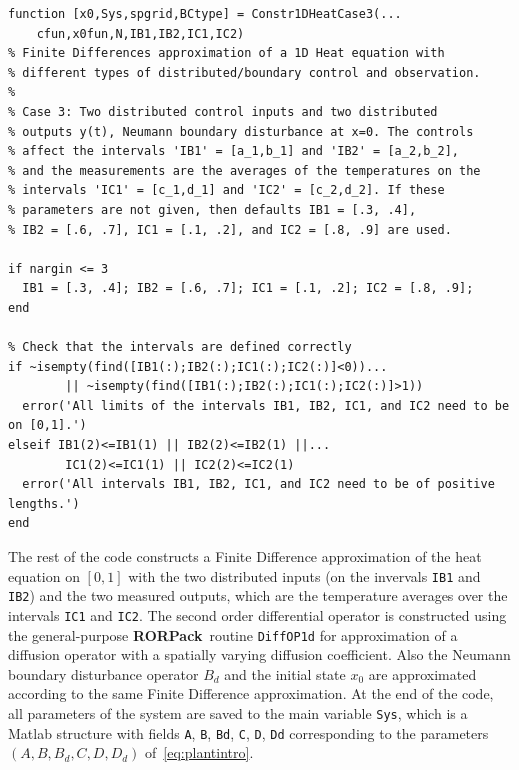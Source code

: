 \documentclass[11pt, a4paper]{amsart}
\theoremstyle{definition}
\numberwithin{equation}{section}
\newcommand{\RORname}{\textbf{RORPack}}
\begin{document}
\begin{lstlisting}
function [x0,Sys,spgrid,BCtype] = Constr1DHeatCase3(...
    cfun,x0fun,N,IB1,IB2,IC1,IC2)
% Finite Differences approximation of a 1D Heat equation with
% different types of distributed/boundary control and observation.
%
% Case 3: Two distributed control inputs and two distributed 
% outputs y(t), Neumann boundary disturbance at x=0. The controls 
% affect the intervals 'IB1' = [a_1,b_1] and 'IB2' = [a_2,b_2],
% and the measurements are the averages of the temperatures on the
% intervals 'IC1' = [c_1,d_1] and 'IC2' = [c_2,d_2]. If these
% parameters are not given, then defaults IB1 = [.3, .4],
% IB2 = [.6, .7], IC1 = [.1, .2], and IC2 = [.8, .9] are used.

if nargin <= 3
  IB1 = [.3, .4]; IB2 = [.6, .7]; IC1 = [.1, .2]; IC2 = [.8, .9];
end

% Check that the intervals are defined correctly
if ~isempty(find([IB1(:);IB2(:);IC1(:);IC2(:)]<0))...
        || ~isempty(find([IB1(:);IB2(:);IC1(:);IC2(:)]>1))
  error('All limits of the intervals IB1, IB2, IC1, and IC2 need to be on [0,1].')
elseif IB1(2)<=IB1(1) || IB2(2)<=IB2(1) ||...
        IC1(2)<=IC1(1) || IC2(2)<=IC2(1)
  error('All intervals IB1, IB2, IC1, and IC2 need to be of positive lengths.')
end
  \end{lstlisting}

The rest of the code constructs a Finite Difference approximation of the heat equation on $[0,1]$ with the two distributed inputs (on the invervals \texttt{IB1} and \texttt{IB2}) and the two measured outputs, which are the temperature averages over the intervals \texttt{IC1} and \texttt{IC2}. The second order differential operator is constructed using the general-purpose \RORname\ routine \texttt{DiffOP1d} for approximation of a diffusion operator with a spatially varying diffusion coefficient.
Also the Neumann boundary disturbance operator $B_d$ and the initial state $x_0$ are approximated according to the same Finite Difference approximation. At the end of the code, all parameters of the system are saved to the main variable \texttt{Sys}, which is a Matlab structure with fields 
\texttt{A}, \texttt{B}, \texttt{Bd},  
\texttt{C}, \texttt{D}, \texttt{Dd}
corresponding to the parameters $(A,B,B_d,C,D,D_d)$ of~\eqref{eq:plantintro}.
\end{document}
